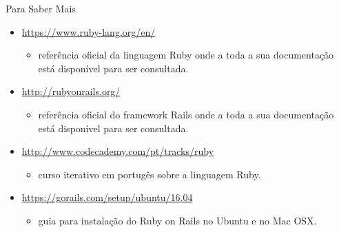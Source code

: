 \begin{frame}[fragile,t]{Para Saber Mais}
  \begin{itemize}
    \item \url{https://www.ruby-lang.org/en/}
    \begin{itemize}
     \item referência oficial da linguagem Ruby onde a toda a sua documentação está disponível
	para ser consultada.
    \end{itemize}

    \item \url{http://rubyonrails.org/}
    \begin{itemize}
     \item referência oficial do framework Rails onde a toda a sua documentação está disponível
	para ser consultada.
    \end{itemize}
    
    \item \url{http://www.codecademy.com/pt/tracks/ruby}
    \begin{itemize}
     \item curso iterativo em portugês sobre a linguagem Ruby.
    \end{itemize}

	\item \url{https://gorails.com/setup/ubuntu/16.04}
	\begin{itemize}
		\item guia para instalação do Ruby on Rails no Ubuntu e no Mac OSX.
	\end{itemize}
  \end{itemize}
  
  
\end{frame}